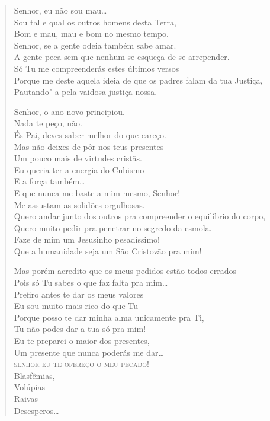 {\begin{verse}
Senhor, eu não sou mau\ldots{}\\
Sou tal e qual os outros homens desta Terra,\\
Bom e mau, mau e bom no mesmo tempo.\\
Senhor, se a gente odeia também sabe amar.\\
A gente peca sem que nenhum se esqueça de se arrepender.\\
Só Tu me compreenderás estes últimos versos\\
Porque me deste aquela ideia de que os padres falam da tua Justiça,\\
Pautando"-a pela vaidosa justiça nossa.

Senhor, o ano novo principiou.\\
Nada te peço, não.\\
És Pai, deves saber melhor do que careço.\\
Mas não deixes de pôr nos teus presentes\\
Um pouco mais de virtudes cristãs.\\
Eu queria ter a energia do Cubismo\\
E a força também\ldots{}\\
E que nunca me baste a mim mesmo, Senhor!\\
Me assustam as solidões orgulhosas.\\
Quero andar junto dos outros pra compreender o equilíbrio do corpo,\\
Quero muito pedir pra penetrar no segredo da esmola.\\
Faze de mim um Jesusinho pesadíssimo!\\
Que a humanidade seja um São Cristovão pra mim!

Mas porém acredito que os meus pedidos estão todos errados\\
Pois só Tu sabes o que faz falta pra mim\ldots{}\\
Prefiro antes te dar os meus valores\\
Eu sou muito mais rico do que Tu\\
Porque posso te dar minha alma unicamente pra Ti,\\
Tu não podes dar a tua só pra mim!\\
Eu te preparei o maior dos presentes,\\
Um presente que nunca poderás me dar\ldots{}\\
\textsc{senhor eu te ofereço o meu pecado!}\\
\qquad\qquad\qquad\qquad\qquad\qquad Blasfêmias,\\
\qquad\qquad\qquad\qquad\qquad\qquad Volúpias\\
\qquad\qquad\qquad\qquad\qquad\qquad Raivas\\
\qquad\qquad\qquad\qquad\qquad\qquad Desesperos\ldots{}


\end{verse}}
